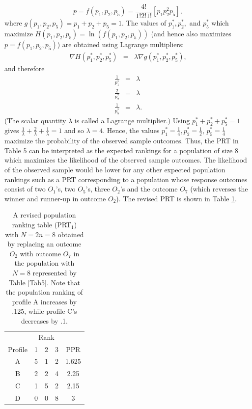 \documentclass[a4paper, 12pt]{article}
\begin{document}
\begin{equation}
p=f(p_1,p_2,p_5)=\frac{4!}{1!2!1!}[p_1p_2^2p_5],
\end{equation}
\label{eq:1}
{\flushleft where} $g(p_1,p_2,p_5)=p_1+p_2+p_5=1$.
The values of $p_1^*,p_2^*,$ and $p_5^*$ which maximize $H(p_1,p_2,p_5)=\ln (f(p_1,p_2,p_5))$ (and hence also maximizes $p=f(p_1,p_2,p_5)$)  are obtained using Lagrange multipliers:
\begin{eqnarray*}
\nabla H(p_1^*,p_2^*,p_5^*) & = & \lambda \nabla g
(p_1^*,p_2^*,p_5^*),
\end{eqnarray*}
{\flushleft and therefore}
\begin{eqnarray*}
\frac{1}{p_1^*} & = & \lambda\\
\frac{2}{p_2^*} & = & \lambda\\
\frac{1}{p_5^*} & = & \lambda.
\end{eqnarray*}
{\flushleft (The scalar quantity $\lambda$ is called a Lagrange multiplier.) Using} $p_1^*+p_2^*+p_5^*=1$ gives $\frac{1}{\lambda} + \frac{2}{\lambda}+\frac{1}{\lambda}=1$ and so $ \lambda = 4$.  Hence, the values $p_1^*=\frac{1}{4}, p_2^*=\frac{1}{2}$, $p_5^*=\frac{1}{4}$ maximize the probability of the observed sample outcomes.  Thus, the PRT in Table 5 can be interpreted as the expected rankings for a population of size 8 which maximizes the likelihood of the observed sample outcomes.  The likelihood of the observed sample would be lower for any other expected population rankings such as a PRT corresponding to a population whose response outcomes  consist of two $O_1$'s, two $O_5$'s, three $O_2$'s and the outcome $O_7$ (which reverses the winner and runner-up in outcome $O_2$).  The revised PRT is shown in Table \ref{Tab6}.
\begin{table}[!htpb]
\centering
\scriptsize
\begin{tabular}{c|ccc|c}
&\multicolumn{3}{c}{Rank}&\\
Profile& 1 & 2 & 3&PPR\\\hline
A& 5&1&2&1.625\\
B& 2 &2&4 &2.25\\
C& 1 &5&2&2.15 \\
D& 0 &0&8&3 \\
\end{tabular}
\caption{{\small A revised population ranking table (PRT$_1$) with $N=2n=8$ obtained by replacing an outcome $O_2$ with outcome $O_7$ in the population with $N=8$ represented by Table \ref{Tab5}. Note that the population ranking of profile A increases by .125, while profile C's decreases by .1.}}
\label{Tab6}
\end{table}
\end{document}
